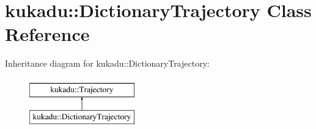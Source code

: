 \hypertarget{classkukadu_1_1DictionaryTrajectory}{\section{kukadu\-:\-:Dictionary\-Trajectory Class Reference}
\label{classkukadu_1_1DictionaryTrajectory}
}
Inheritance diagram for kukadu\-:\-:Dictionary\-Trajectory\-:\begin{figure}[H]
\begin{center}
\leavevmode
\includegraphics[height=2.000000cm]{classkukadu_1_1DictionaryTrajectory}
\end{center}
\end{figure}
